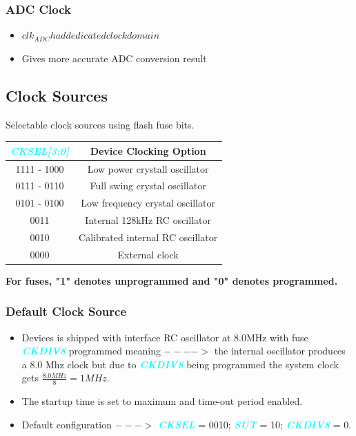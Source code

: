 \documentclass{article}
\newcommand{\bitFormat}[1]{\emph{\textbf{\textcolor{cyan}{#1}}}}
\begin{document}
\subsubsection{ADC Clock}
\begin{itemize}
    \item $clk_{ADC} had dedicated clock domain$
    \item Gives more accurate ADC conversion result
\end{itemize}

\subsection{Clock Sources}
\quad Selectable clock sources using flash fuse bits.

\begin{table}[H]
    \begin{center}
        \begin{tabular}{c|c}
            \textbf{\bitFormat{CKSEL[3:0]}} & \textbf{Device Clocking Option}\\
            \hline
            1111 - 1000 & Low power crystall oscillator\\
            0111 - 0110 & Full swing crystal oscillator\\
            0101 - 0100 & Low frequency crystal oscillator\\
            0011 & Internal 128kHz RC oscillator\\
            0010 & Calibrated internal RC oscillator\\
            0000 & External clock            
        \end{tabular}
    \end{center}
\end{table}

{\Large \textbf{For fuses, "1" denotes unprogrammed and "0" denotes programmed.}}

\subsubsection*{Default Clock Source}
\begin{itemize}
    \item Devices is shipped with interface RC oscillator at 8.0MHz with fuse \bitFormat{CKDIV8} programmed meaning $---->$ the internal oscillator produces a 8.0 Mhz clock but due to \bitFormat{CKDIV8} being programmed the system clock gets $\frac{8.0 MHz}{8} = 1 MHz$.
    \item The startup time is set to maximum and time-out period enabled.
    \item Default configuration $--->$ \bitFormat{CKSEL} = 0010; \bitFormat{SUT} = 10; \bitFormat{CKDIV8} = 0.
\end{itemize}
\end{document}

